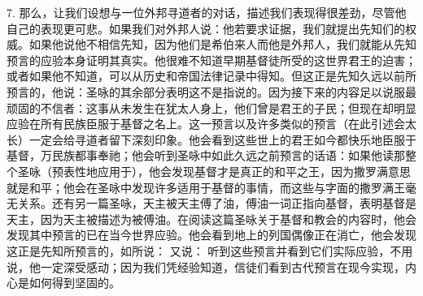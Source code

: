 7. 那么，让我们设想与一位外邦寻道者的对话，描述我们表现得很差劲，尽管他自己的表现更可悲。如果我们对外邦人说：他若要求证据，我们就提出先知们的权威。如果他说他不相信先知，因为他们是希伯来人而他是外邦人，我们就能从先知预言的应验本身证明其真实。他很难不知道早期基督徒所受的这世界君王的迫害；或者如果他不知道，可以从历史和帝国法律记录中得知。但这正是先知久远以前所预言的，他说：圣咏的其余部分表明这不是指说的。因为接下来的内容足以说服最顽固的不信者：这事从未发生在犹太人身上，他们曾是君王的子民；但现在却明显应验在所有民族臣服于基督之名上。这一预言以及许多类似的预言（在此引述会太长）一定会给寻道者留下深刻印象。他会看到这些世上的君王如今都快乐地臣服于基督，万民族都事奉祂；他会听到圣咏中如此久远之前预言的话语：如果他读那整个圣咏（预表性地应用于），他会发现基督才是真正的和平之王，因为撒罗满意思就是和平；他会在圣咏中发现许多适用于基督的事情，而这些与字面的撒罗满王毫无关系。还有另一篇圣咏，天主被天主傅了油，傅油一词正指向基督，表明基督是天主，因为天主被描述为被傅油。在阅读这篇圣咏关于基督和教会的内容时，他会发现其中预言的已在当今世界应验。他会看到地上的列国偶像正在消亡，他会发现这正是先知所预言的，如所说： 又说： 听到这些预言并看到它们实际应验，不用说，他一定深受感动；因为我们凭经验知道，信徒们看到古代预言在现今实现，内心是如何得到坚固的。\par

